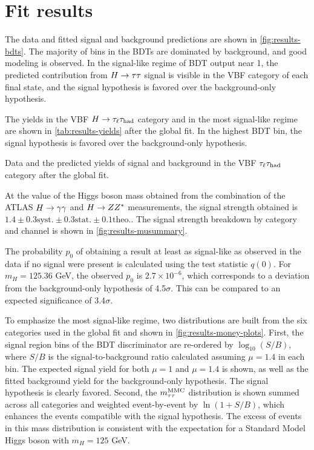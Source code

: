 \section{Fit results}
\label{sec:results-fit-results}

The data and fitted signal and background predictions are shown in \cref{fig:results-bdts}. The majority of bins in the BDTs are dominated by background, and good modeling is observed. In the signal-like regime of BDT output near 1, the predicted contribution from $H\rightarrow\tau\tau$ signal is visible in the VBF category of each final state, and the signal hypothesis is favored over the background-only hypothesis.

The yields in the VBF $H\rightarrow\tau_\ell\tau_\text{had}$ category and in the most signal-like regime are shown in \cref{tab:results-yields} after the global fit. In the highest BDT bin, the signal hypothesis is favored over the background-only hypothesis.

\begin{table}[bp] 
  \centering
  \renewcommand{\arraystretch}{1.4}
  \caption{Data and the predicted yields of signal and background in the VBF $\tau_\ell\tau_\text{had}$ category after the global fit.}
  
  \label{tab:results-yields}
\end{table}

At the value of the Higgs boson mass obtained from the combination of the ATLAS $H\rightarrow \gamma\gamma$ and $H\rightarrow ZZ^\ast$ measurements, the signal strength obtained is $1.4 \pm 0.3 \text{syst.} \pm 0.3 \text{stat.} \pm 0.1 \text{theo.}$. The signal strength breakdown by category and channel is shown in \cref{fig:results-musummary}.

The probability $p_0$ of obtaining a result at least as signal-like as observed in the data if no signal were present is calculated using the test statistic $q(0)$. For $m_H = 125.36$ GeV, the observed $p_0$ is $2.7 \times 10^{-6}$, which corresponds to a deviation from the background-only hypothesis of 4.5$\sigma$.  This can be compared to an expected significance of 3.4$\sigma$.

To emphasize the most signal-like regime, two distributions are built from the six categories used in the global fit and shown in \cref{fig:results-money-plots}. First, the signal region bins of the BDT discriminator are re-ordered by $\log_{10}(S/B)$, where $S/B$ is the signal-to-background ratio calculated assuming $\mu=1.4$ in each bin. The expected signal yield for both $\mu=1$ and $\mu=1.4$ is shown, as well as the fitted background yield for the background-only hypothesis. The signal hypothesis is clearly favored. Second, the $m_{\tau\tau}^\text{MMC}$ distribution is shown summed across all categories and weighted event-by-event by $\ln(1+S/B)$, which enhances the events compatible with the signal hypothesis. The excess of events in this mass distribution is consistent with the expectation for a Standard Model Higgs boson with $m_H = 125$ GeV.

